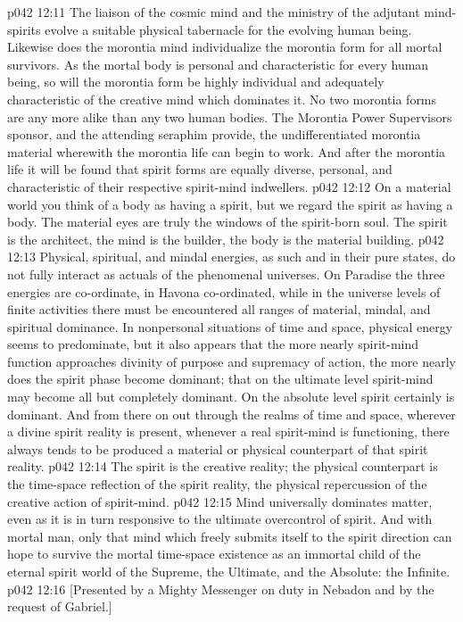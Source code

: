 \vs p042 12:11 The liaison of the cosmic mind and the ministry of the adjutant mind\hyp{}spirits evolve a suitable physical tabernacle for the evolving human being. Likewise does the morontia mind individualize the morontia form for all mortal survivors. As the mortal body is personal and characteristic for every human being, so will the morontia form be highly individual and adequately characteristic of the creative mind which dominates it. No two morontia forms are any more alike than any two human bodies. The Morontia Power Supervisors sponsor, and the attending seraphim provide, the undifferentiated morontia material wherewith the morontia life can begin to work. And after the morontia life it will be found that spirit forms are equally diverse, personal, and characteristic of their respective spirit\hyp{}mind indwellers.
\pc \vs p042 12:12 On a material world you think of a body as having a spirit, but we regard the spirit as having a body. The material eyes are truly the windows of the spirit\hyp{}born soul. The spirit is the architect, the mind is the builder, the body is the material building.
\pc \vs p042 12:13 Physical, spiritual, and mindal energies, as such and in their pure states, do not fully interact as actuals of the phenomenal universes. On Paradise the three energies are co\hyp{}ordinate, in Havona co\hyp{}ordinated, while in the universe levels of finite activities there must be encountered all ranges of material, mindal, and spiritual dominance. In nonpersonal situations of time and space, physical energy seems to predominate, but it also appears that the more nearly spirit\hyp{}mind function approaches divinity of purpose and supremacy of action, the more nearly does the spirit phase become dominant; that on the ultimate level spirit\hyp{}mind may become all but completely dominant. On the absolute level spirit certainly is dominant. And from there on out through the realms of time and space, wherever a divine spirit reality is present, whenever a real spirit\hyp{}mind is functioning, there always tends to be produced a material or physical counterpart of that spirit reality.
\vs p042 12:14 The spirit is the creative reality; the physical counterpart is the time\hyp{}space reflection of the spirit reality, the physical repercussion of the creative action of spirit\hyp{}mind.
\vs p042 12:15 Mind universally dominates matter, even as it is in turn responsive to the ultimate overcontrol of spirit. And with mortal man, only that mind which freely submits itself to the spirit direction can hope to survive the mortal time\hyp{}space existence as an immortal child of the eternal spirit world of the Supreme, the Ultimate, and the Absolute: the Infinite.
\vsetoff
\vs p042 12:16 [Presented by a Mighty Messenger on duty in Nebadon and by the request of Gabriel.]
